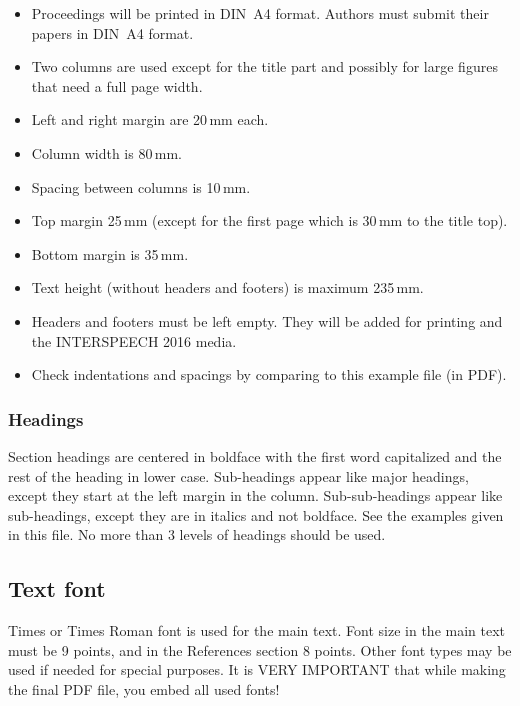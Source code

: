 \documentclass[a4paper]{article}
\begin{document}
      \begin{itemize}
        \item Proceedings will be printed in DIN~A4 format. Authors must submit their papers in DIN~A4 format.
        \item Two columns are used except for the title part and possibly for large figures that need a full page width.
        \item Left and right margin are 20\,mm each.
        \item Column width is 80\,mm.
        \item Spacing between columns is 10\,mm.
        \item Top margin 25\,mm (except for the first page which is 30\,mm to the title top).
        \item Bottom margin is 35\,mm.
        \item Text height (without headers and footers) is maximum 235\,mm.
        \item Headers and footers must be left empty. They will be added for printing and the INTERSPEECH 2016 media.
        \item Check indentations and spacings by comparing to this example file (in PDF).
      \end{itemize}


      \subsubsection{Headings}

        Section headings are centered in boldface with the first word capitalized and the rest of the heading in lower case.
        Sub-headings appear like major headings, except they start at the left margin in the column.
        Sub-sub-headings appear like sub-headings, except they are in italics and not boldface. 
        See the examples given in this file. 
        No more than 3 levels of headings should be used.

  
    \subsection{Text font}

      Times or Times Roman font is used for the main text. 
      Font size in the main text must be 9 points, and in the References section 8 points. 
      Other font types may be used if needed for special purposes. 
      It is VERY IMPORTANT that while making the final PDF file, you embed all used fonts!
\end{document}
